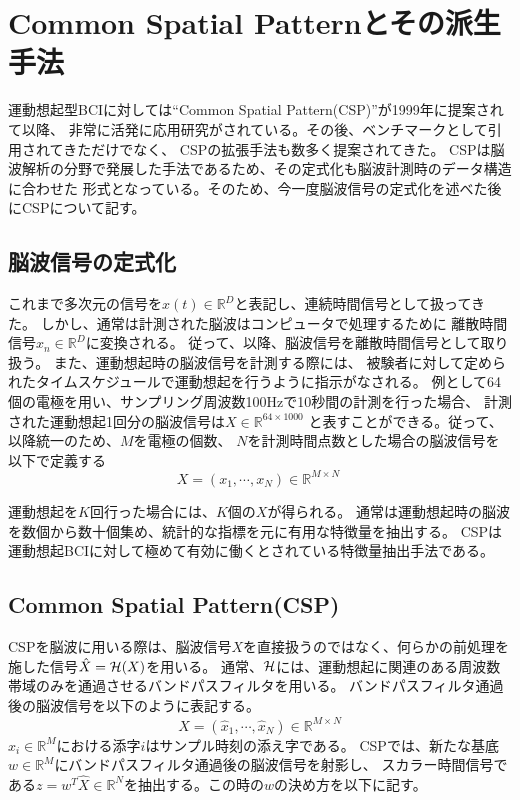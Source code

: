 
\section{Common Spatial Patternとその派生手法}
運動想起型BCIに対しては``Common Spatial Pattern(CSP)''が1999年に提案されて以降、
非常に活発に応用研究がされている。その後、ベンチマークとして引用されてきただけでなく、
CSPの拡張手法も数多く提案されてきた。
CSPは脳波解析の分野で発展した手法であるため、その定式化も脳波計測時のデータ構造に合わせた
形式となっている。そのため、今一度脳波信号の定式化を述べた後にCSPについて記す。

\subsection{脳波信号の定式化}
これまで多次元の信号を\(x(t)\in \mathbb R^D\)と表記し、連続時間信号として扱ってきた。
しかし、通常は計測された脳波はコンピュータで処理するために
離散時間信号\(x_n \in \mathbb R^D\)に変換される。
従って、以降、脳波信号を離散時間信号として取り扱う。
また、運動想起時の脳波信号を計測する際には、
被験者に対して定められたタイムスケジュールで運動想起を行うように指示がなされる。
例として64個の電極を用い、サンプリング周波数100Hzで10秒間の計測を行った場合、
計測された運動想起1回分の脳波信号は\(X \in \mathbb{R}^{64 \times 1000}\)
と表すことができる。従って、以降統一のため、\(M\)を電極の個数、
\(N\)を計測時間点数とした場合の脳波信号を以下で定義する\begin{equation}
    X =(x_1, \cdots, x_N)\in \mathbb{R}^{M \times N}\    
\end{equation}


運動想起を\(K\)回行った場合には、\(K\)個の\(X\)が得られる。
通常は運動想起時の脳波を数個から数十個集め、統計的な指標を元に有用な特徴量を抽出する。
CSPは運動想起BCIに対して極めて有効に働くとされている特徴量抽出手法である。


\subsection{Common Spatial Pattern(CSP)}
\label{subsec:CSP}

CSPを脳波に用いる際は、脳波信号\(X\)を直接扱うのではなく、何らかの前処理を施した信号\(\hat{X} = {\cal H}(X) \)を用いる。
通常、\(\cal H\)には、運動想起に関連のある周波数帯域のみを通過させるバンドパスフィルタを用いる。
バンドパスフィルタ通過後の脳波信号を以下のように表記する。
\begin{equation}
    \hat X = \left( \hat x_1,\cdots,\hat x_N \right) \in \mathbb{R}^{M \times N}
\end{equation}
\(\hat x_i \in \mathbb R^M\)における添字\(i\)はサンプル時刻の添え字である。
CSPでは、新たな基底\(w\in \mathbb R^M\)にバンドパスフィルタ通過後の脳波信号を射影し、
スカラー時間信号である\(z=w^T\hat X\in \mathbb R^N\)を抽出する。この時の\(w\)の決め方を以下に記す。

